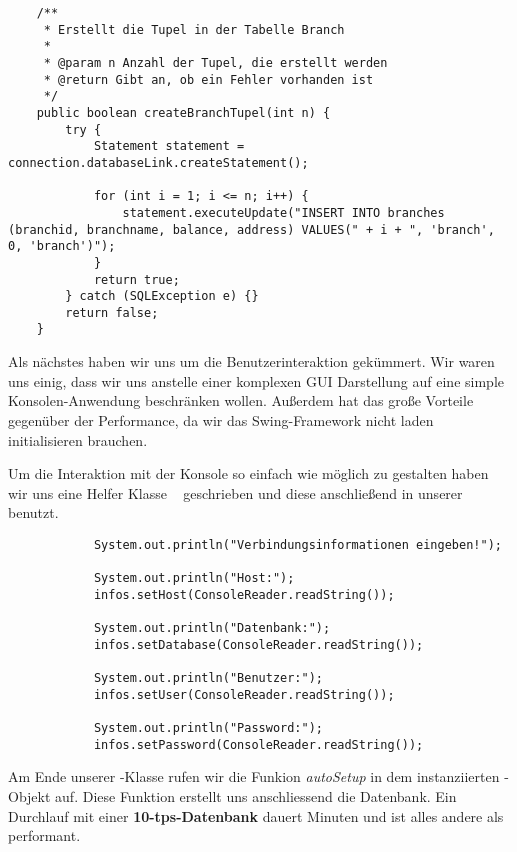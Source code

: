 \begin{lstlisting}
	/**
	 * Erstellt die Tupel in der Tabelle Branch
	 * 
	 * @param n Anzahl der Tupel, die erstellt werden
	 * @return Gibt an, ob ein Fehler vorhanden ist
	 */
	public boolean createBranchTupel(int n) {
		try {
			Statement statement = connection.databaseLink.createStatement();

			for (int i = 1; i <= n; i++) {
				statement.executeUpdate("INSERT INTO branches (branchid, branchname, balance, address) VALUES(" + i + ", 'branch', 0, 'branch')");
			}
			return true;
		} catch (SQLException e) {}		
		return false;
	}
\end{lstlisting}

Als nächstes haben wir uns um die Benutzerinteraktion gekümmert. Wir waren uns
einig, dass wir uns anstelle einer komplexen GUI Darstellung auf eine simple
Konsolen-Anwendung beschränken wollen. Außerdem hat das große Vorteile gegenüber
der Performance, da wir das Swing-Framework nicht laden initialisieren
brauchen.

Um die Interaktion mit der Konsole so einfach wie möglich zu gestalten haben wir
uns eine Helfer Klasse ~ geschrieben und diese anschließend
in unserer  benutzt.

\begin{lstlisting}
			System.out.println("Verbindungsinformationen eingeben!");
			
			System.out.println("Host:");
			infos.setHost(ConsoleReader.readString());

			System.out.println("Datenbank:");
			infos.setDatabase(ConsoleReader.readString());
			
			System.out.println("Benutzer:");
			infos.setUser(ConsoleReader.readString());
			
			System.out.println("Password:");
			infos.setPassword(ConsoleReader.readString());
\end{lstlisting}

Am Ende unserer -Klasse rufen wir die Funkion
\textit{autoSetup} in dem instanziierten -Objekt auf. Diese Funktion erstellt uns
anschliessend die Datenbank. Ein Durchlauf mit einer \textbf{10-tps-Datenbank}
dauert  Minuten und ist alles andere als performant.
\clearpage
